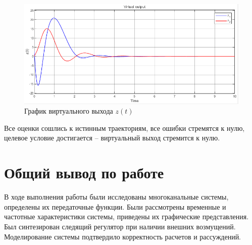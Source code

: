 \documentclass[a4paper, 12pt]{article}
\begin{document}
    \begin{figure}[H]
        \centering
        \includegraphics[scale=0.75]{2task_z.png}
        \captionsetup{skip=0pt}
        \caption{График виртуального выхода $z(t)$}
        \label{fig:2task_z}
    \end{figure}
    \noindent Все оценки сошлись к истинным траекториям, все ошибки стремятся к нулю, целевое условие достигается
    -- виртуальный выход стремится к нулю.


    \section{Общий вывод по работе}
    В ходе выполнения работы были исследованы
    многоканальные системы, определены их передаточные функции.
    Были рассмотрены временные
    и частотные характеристики системы, приведены их
    графические представления. Был синтезирован
    следящий регулятор при наличии внешних возмущений.
    Моделирование системы подтвердило корректность расчетов
    и рассуждений.
\end{document}
